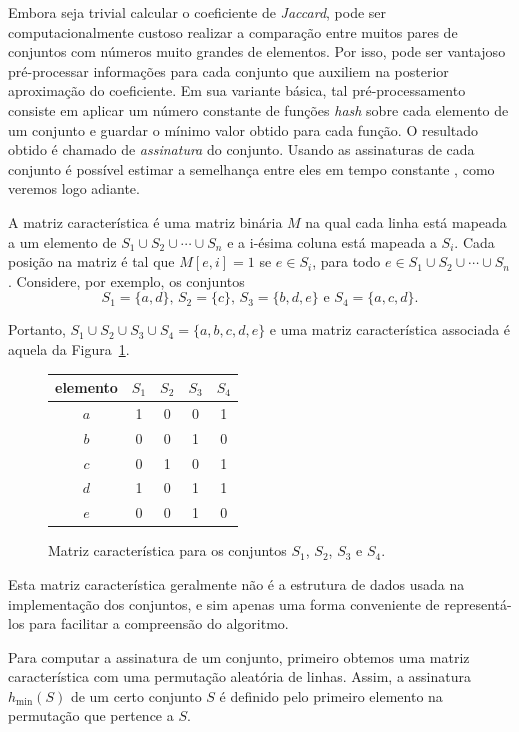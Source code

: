 Embora seja trivial calcular o coeficiente de \emph{Jaccard}, pode ser computacionalmente custoso realizar a comparação entre muitos pares de conjuntos com números muito grandes de elementos. Por isso, pode ser vantajoso pré-processar informações para cada conjunto que auxiliem na posterior aproximação do coeficiente. Em sua variante básica, tal pré-processamento consiste em aplicar um número constante de funções \emph{hash} sobre cada elemento de um conjunto e guardar o mínimo valor obtido para cada função. O resultado obtido é chamado de \emph{assinatura} do conjunto. Usando as assinaturas de cada conjunto é possível estimar a semelhança entre eles em tempo constante \cite{broder1997resemblance}, como veremos logo adiante.

A matriz característica é uma matriz binária $M$ na qual cada linha está mapeada a um elemento de $S_1 \cup S_2 \cup \cdots \cup S_n$ e a i-ésima coluna está mapeada a $S_i$. Cada posição na matriz é tal que $M[e, i] = 1$ se $e \in S_i$, para todo $e \in S_1 \cup S_2 \cup \cdots \cup S_n$. Considere, por exemplo, os conjuntos
\[
    S_1 = \{a, d\} \text{, } 
    S_2 = \{c\} \text{, } 
    S_3 = \{b, d, e\} \text{ e }
    S_4 = \{a, c, d\} \text{.}
\]

Portanto, $S_1 \cup S_2 \cup S_3 \cup S_4 = \{a, b, c, d, e\}$ e uma matriz característica associada é aquela da Figura~\ref{fig:minhash_charmatrix}.

\begin{figure}[!htbp]
\centering
\begin{tabular}{ c || c | c | c | c }
 elemento & $S_1$ & $S_2$ & $S_3$ & $S_4$ \\
\hline
  $a$ & 1   & 0   & 0   & 1   \\
  $b$ & 0   & 0   & 1   & 0   \\
  $c$ & 0   & 1   & 0   & 1   \\
  $d$ & 1   & 0   & 1   & 1   \\
  $e$ & 0   & 0   & 1   & 0   \\
\end{tabular}
\caption{Matriz característica para os conjuntos $S_1$, $S_2$, $S_3$ e $S_4$.}
\label{fig:minhash_charmatrix}
\end{figure}

Esta matriz característica geralmente não é a estrutura de dados usada na implementação dos conjuntos, e sim apenas uma forma conveniente de representá-los para facilitar a compreensão do algoritmo.

Para computar a assinatura de um conjunto, primeiro obtemos uma matriz característica com uma permutação aleatória de linhas. Assim, a assinatura $h_{\min}(S)$ de um certo conjunto $S$ é definido pelo primeiro elemento na permutação que pertence a $S$.

